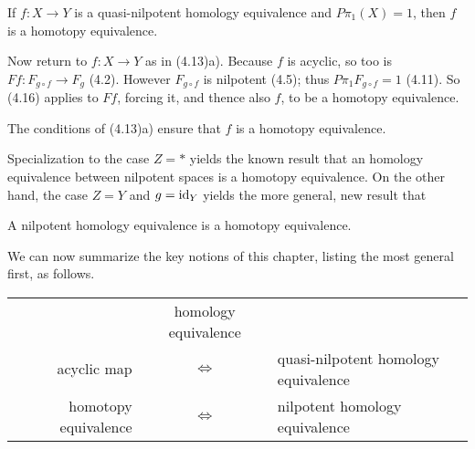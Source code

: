 \begin{theorem}
  If $f\colon   X \longrightarrow Y$ is a quasi-nilpotent homology equivalence and $P\pi_1(X)=1$, then $f$ is a homotopy equivalence.
 \end{theorem} 

Now return to $f\colon   X \longrightarrow Y $ as in (4.13)a). Because $f$ is acyclic, so too is $Ff\colon   F_{g\circ f}\longrightarrow F_g$ (4.2).
However $F_{g\circ f}$ is nilpotent (4.5); thus $P\pi_1F_{g\circ f} = 1$ (4.11). So (4.16) applies to $Ff$, forcing it, and thence also $f$, to be a homotopy equivalence.

\begin{prop}
  The conditions of (4.13)a) ensure that $f$ is a homotopy equivalence.
\end{prop}
Specialization to the case $Z = *$ yields the known result that an homology equivalence between nilpotent spaces is a homotopy equivalence. On the other hand, the case $Z =Y$ and $g = \mathrm{id}_Y$ yields the more general, new result that

\begin{prop}
   A nilpotent homology equivalence is a homotopy equivalence.
 \end{prop}

We can now summarize the key notions of this chapter, listing the most general first, as follows.
\begin{tabular}{rcl}
 &homology equivalence& \\
 acyclic map &$\Longleftrightarrow $ &quasi-nilpotent homology equivalence \\
 homotopy equivalence &$\Longleftrightarrow $ &nilpotent homology equivalence
\end{tabular}
 
